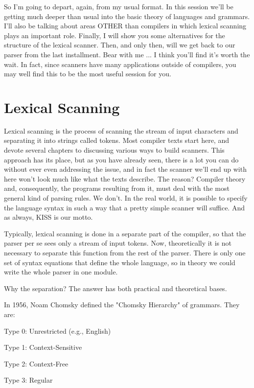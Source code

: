 \documentclass[float=false, crop=false]{standalone}
\begin{document}
So I'm going to depart, again, from my usual format. In this session we'll be
getting much deeper than usual into the basic theory of languages and grammars.
I'll also be talking about areas OTHER than compilers in which lexical scanning
plays an important role. Finally, I will show you some alternatives for the
structure of the lexical scanner. Then, and only then, will we get back to our
parser from the last installment. Bear with me ... I think you'll find it's
worth the wait. In fact, since scanners have many applications outside of
compilers, you may well find this to be the most useful session for you.

\section{Lexical Scanning}

Lexical scanning is the process of scanning the stream of input characters and
separating it into strings called tokens. Most compiler texts start here, and
devote several chapters to discussing various ways to build scanners. This
approach has its place, but as you have already seen, there is a lot you can do
without ever even addressing the issue, and in fact the scanner we'll end up
with here won't look much like what the texts describe. The reason? Compiler
theory and, consequently, the programs resulting from it, must deal with the
most general kind of parsing rules. We don't. In the real world, it is possible
to specify the language syntax in such a way that a pretty simple scanner will
suffice. And as always, KISS is our motto.

Typically, lexical scanning is done in a separate part of the compiler, so that
the parser per se sees only a stream of input tokens. Now, theoretically it is
not necessary to separate this function from the rest of the parser. There is
only one set of syntax equations that define the whole language, so in theory we
could write the whole parser in one module.

Why the separation? The answer has both practical and theoretical bases.

In 1956, Noam Chomsky defined the "Chomsky Hierarchy" of grammars. They are:

\begin{enumeration}
\item Type 0:  Unrestricted (e.g., English)
\item Type 1:  Context-Sensitive
\item Type 2:  Context-Free
\item Type 3:  Regular
\end{enumeration}
\end{document}
